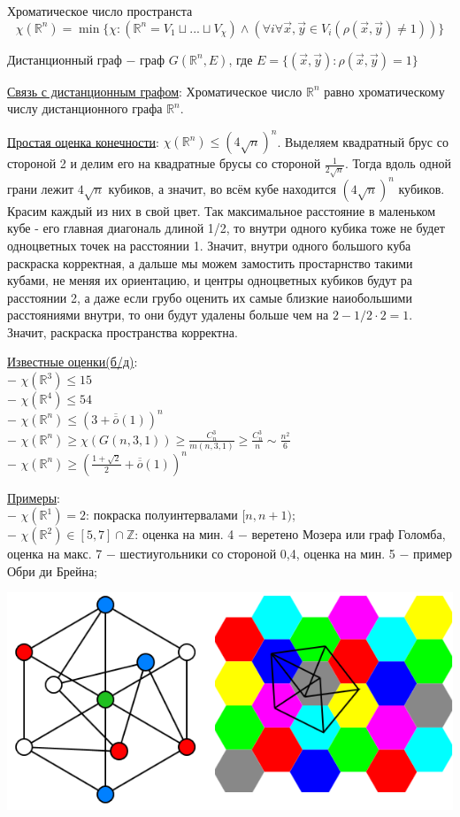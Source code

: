 \Def Хроматическое число пространста
$$\chi(\mathbb{R}^n)=\min\{\chi: (\mathbb{R}^n=V_1\! \sqcup\! ...\! \sqcup V_\chi)\! \wedge\! (\forall i \forall \vec{x}, \vec{y} \in V_i(\rho(\vec{x}, \vec{y}) \neq 1))\}$$

\Def Дистанционный граф $-$ граф $G(\mathbb{R}^n, E)$, где $E = \{ (\vec{x}, \vec{y}): \rho(\vec{x}, \vec{y})=1 \}$

\underline{Связь с дистанционным графом}: Хроматическое число $\mathbb{R}^n$ равно хроматическому числу дистанционного графа $\mathbb{R}^n$.

\underline{Простая оценка конечности}: $\chi(\mathbb{R}^n) \leqslant (4 \sqrt{n})^n$.
\Proof Выделяем квадратный брус со стороной 2 и делим его на квадратные брусы со стороной $\frac{1}{2\sqrt{n}}$. Тогда вдоль одной грани лежит $4 \sqrt{n}$ кубиков, а значит, во всём кубе находится $(4 \sqrt{n})^{n}$ кубиков. Красим каждый из них в свой цвет. Так максимальное расстояние в маленьком кубе - его главная диагональ длиной 1/2, то внутри одного кубика тоже не будет одноцветных точек на расстоянии 1. Значит, внутри одного большого куба раскраска корректная, а дальше мы можем замостить простарнство такими кубами, не меняя их ориентацию, и центры одноцветных кубиков будут ра расстоянии 2, а даже если грубо оценить их самые близкие наиобольшими расстояниями внутри, то они будут удалены больше чем на $2 - 1/2 \cdot 2=1$. Значит, раскраска пространства корректна. \EndProof

\underline{Известные оценки(б/д)}: \\
$-$ $\chi(\mathbb{R}^3) \leqslant 15$ \\
$-$ $\chi(\mathbb{R}^4) \leqslant 54$ \\
$-$ $\chi(\mathbb{R}^n) \leqslant (3 + \overline{\overline{o}}(1))^n$ \\
$-$ $\chi(\mathbb{R}^n) \geqslant \chi(G(n, 3, 1)) \geqslant \frac{C^3_n}{m(n, 3, 1)} \geqslant \frac{C^3_n}{n} \sim \frac{n^2}{6}$ \\
$-$ $\chi(\mathbb{R}^n) \geqslant \left(\frac{1+\sqrt{2}}{2} +  \overline{\overline{o}}(1) \right)^n$

\underline{Примеры}: \\
$-$ $\chi(\mathbb{R}^1)=2$: покраска полуинтервалами $[n, n+1)$; \\
$-$ $\chi(\mathbb{R}^2) \in [5, 7] \cap \mathbb{Z}$: оценка на мин. 4 $-$ веретено Мозера или граф Голомба, оценка на макс. 7 $-$ шестиугольники со стороной 0,4, оценка на мин. 5 $-$ пример Обри ди Брейна; \\

\begin{center}
    \includegraphics[scale=0.4]{images/Chromatic_plane.png}
\end{center}